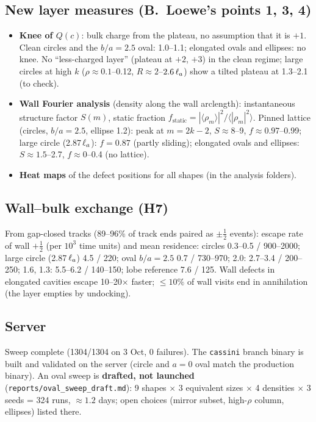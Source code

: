 \subsection{New layer measures (B.~Loewe's points 1, 3, 4)}
\begin{itemize}
  \item \textbf{Knee of $Q(c)$}: bulk charge from the plateau, no assumption that it is $+1$. Clean circles and the $b/a=2.5$ oval:
        1.0--1.1; elongated ovals and ellipses: no knee. No ``less-charged layer'' (plateau at $+2$, $+3$) in the clean regime;
        large circles at high $k$ ($\rho\approx0.1$--0.12, $R\approx2$--$2.6\,\ell_a$) show a tilted plateau at 1.3--2.1 (to check).
  \item \textbf{Wall Fourier analysis} (density along the wall arclength): instantaneous structure factor $S(m)$, static fraction
        $f_\mathrm{static}=|\langle\rho_m\rangle|^2/\langle|\rho_m|^2\rangle$. Pinned lattice (circles, $b/a=2.5$, ellipse 1.2):
        peak at $m=2k-2$, $S\approx8$--9, $f\approx0.97$--0.99; large circle (2.87\,$\ell_a$): $f=0.87$ (partly sliding);
        elongated ovals and ellipses: $S\approx1.5$--2.7, $f\approx0$--0.4 (no lattice).
  \item \textbf{Heat maps} of the defect positions for all shapes (in the analysis folders).
\end{itemize}

\subsection{Wall--bulk exchange (H7)}
From gap-closed tracks (89--96\% of track ends paired as $\pm\frac12$ events): escape rate of wall $+\frac12$ (per
$10^3$ time units) and mean residence: circles 0.3--0.5 / 900--2000; large circle (2.87\,$\ell_a$) 4.5 / 220; oval $b/a=2.5$
0.7 / 730--970; 2.0: 2.7--3.4 / 200--250; 1.6, 1.3: 5.5--6.2 / 140--150; lobe reference 7.6 / 125. Wall defects in
elongated cavities escape 10--20$\times$ faster; $\le10\%$ of wall visits end in annihilation (the layer empties by undocking).

\subsection{Server}
Sweep complete (1304/1304 on 3 Oct, 0 failures). The \texttt{cassini} branch binary is built and validated on the server
(circle and $a=0$ oval match the production binary). An oval sweep is \textbf{drafted, not launched}
(\texttt{reports/oval\_sweep\_draft.md}): 9 shapes $\times$ 3 equivalent sizes $\times$ 4 densities $\times$ 3 seeds = 324 runs,
$\approx1.2$ days; open choices (mirror subset, high-$\rho$ column, ellipses) listed there.
